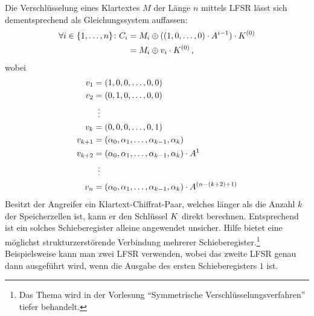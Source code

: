 Die Verschlüsselung eines Klartextes $M$ der Länge $n$ mittels LFSR lässt sich dementsprechend als Gleichungssystem auffassen:
\begin{align*}
	\begin{split}
			\forall i \in \{1,\dots,n\} \colon C_i 	&= M_i \oplus ((1,0,\dots,0) \cdot A^{i-1}) \cdot K^{(0)}\\
									&= M_i \oplus v_i \cdot K^{(0)} \, \text{,}
	\end{split}
\end{align*}
wobei
\begin{align*}
	v_1 &= (1,0,0,\dots,0,0)\\
	v_2 &= (0,1,0,\dots,0,0)\\
	       &\mathrel{\makebox[\widthof{=}]{\vdots}}\\
	v_k &= (0,0,0,\dots,0,1)\\
	v_{k+1} &= (\alpha_0,\alpha_1,\dots,\alpha_{k-1},\alpha_k)\\
	v_{k+2} &= (\alpha_0,\alpha_1,\dots,\alpha_{k-1},\alpha_k) \cdot A^1\\
	             &\mathrel{\makebox[\widthof{=}]{\vdots}}\\
	v_n &= (\alpha_0,\alpha_1,\dots,\alpha_{k-1},\alpha_k) \cdot A^{(n-(k+2)+1)}
\end{align*}
Besitzt der Angreifer ein Klartext-Chiffrat-Paar, welches länger als die Anzahl $k$ der Speicherzellen ist, kann er den Schlüssel $K$ direkt berechnen. Entsprechend ist ein solches Schieberegister alleine angewendet unsicher. Hilfe bietet eine möglichst strukturzerstörende Verbindung mehrerer Schieberegister.\footnote{Das Thema wird in der Vorlesung "`Symmetrische Verschlüsselungsverfahren"' tiefer behandelt.} Beispielsweise kann man zwei LFSR verwenden, wobei das zweite LFSR genau dann ausgeführt wird, wenn die Ausgabe des ersten Schieberegisters $1$ ist.

